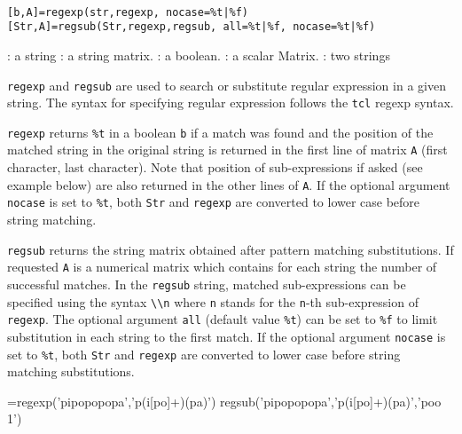 
\begin{mandesc}
   \\
\end{mandesc}
\begin{calling_sequence}
\begin{verbatim}
[b,A]=regexp(str,regexp, nocase=%t|%f)
[Str,A]=regsub(Str,regexp,regsub, all=%t|%f, nocase=%t|%f)
\end{verbatim}
\end{calling_sequence}

\begin{parameters}
  \begin{varlist}
     : a string
     : a string matrix.
    :  a boolean.
    :  a scalar Matrix.
    : two strings
  \end{varlist}
\end{parameters}

\begin{mandescription}
\noindent \verb+regexp+ and \verb+regsub+ are used to search or substitute regular expression
in a given string. The syntax for specifying regular expression follows the \verb+tcl+ 
regexp syntax.

\verb+regexp+ returns \verb+%t+ in a boolean \verb+b+ if a match was found and the 
position of the matched string in the original string is returned in 
the first line of matrix \verb+A+ (first character, last character). 
Note that position of sub-expressions if asked (see example below) 
are also returned in the other lines of \verb+A+. If the optional argument \verb+nocase+ 
is set to \verb+%t+, both \verb+Str+ and \verb+regexp+ are converted to lower case before string matching.

\verb+regsub+ returns the string matrix obtained after pattern matching substitutions. 
If requested \verb+A+ is a numerical matrix which contains for each string the number of successful matches. 
In the \verb+regsub+ string, matched sub-expressions can be specified using the 
syntax \verb+\\n+ where \verb+n+ stands for the \verb+n+-th sub-expression of 
\verb+regexp+. The optional argument \verb+all+ (default value \verb+%t+) can be set to 
\verb+%f+ to limit substitution in each string to the first match. If the optional argument \verb+nocase+ 
is set to \verb+%t+, both \verb+Str+ and \verb+regexp+ are converted to lower case before string matching 
substitutions. 

\end{mandescription}

\begin{examples}
  \begin{program}
    [a,b]=regexp('pipopopopa','p(i[po]+)(pa)')
    regsub('pipopopopa','p(i[po]+)(pa)','poo\\1')
  \end{program}
\end{examples}


